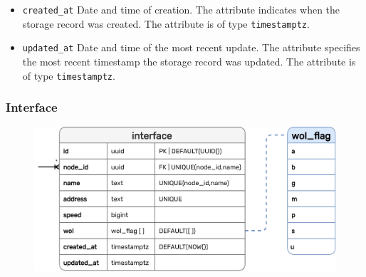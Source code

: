 \begin{itemize}
  \item \texttt{created\_at}
    \newline
    Date and time of creation.
    \newline
    The attribute indicates when the storage record was created.
    \newline
    The attribute is of type \texttt{timestamptz}.

  \item \texttt{updated\_at}
    \newline
    Date and time of the most recent update.
    \newline
    The attribute specifies the most recent timestamp the storage record was updated.
    \newline
    The attribute is of type \texttt{timestamptz}.
\end{itemize}

\subsubsection{Interface}
\label{subsubsec:implementation_server_database_interface}

\begin{figure}
  \centering
  \includegraphics[width=\linewidth]{images/implementation/erm_interface.png}
\end{figure}

